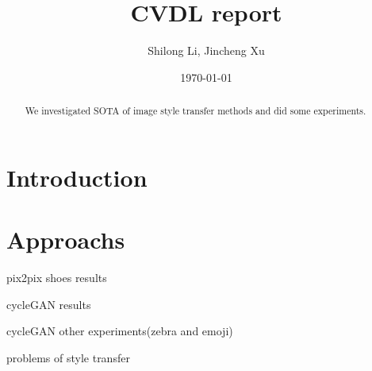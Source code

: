 \documentclass{article}
\begin{document}
\title{CVDL report}
\author{Shilong Li, Jincheng Xu}
\date{\today}
\maketitle

\begin{abstract}
We investigated SOTA of image style transfer methods and did some experiments.

\end{abstract}

\section{Introduction}
\section{Approachs}
\hspace{1.5em}pix2pix shoes results
\par cycleGAN results 
\par cycleGAN other experiments(zebra and emoji)
\par problems of style transfer
\end{document}
